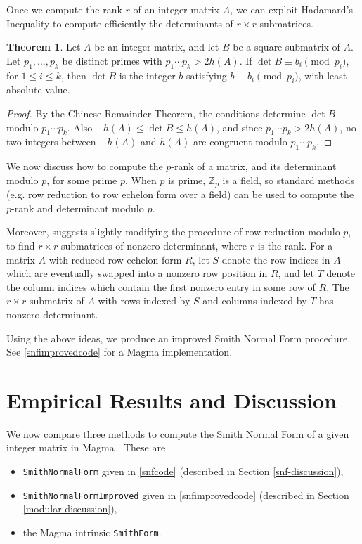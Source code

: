 \documentclass[12pt,a4paper,answers]{exam}
\newcommand{\Z}{\mathbb{Z}}
\theoremstyle{definition}
\newtheorem{theorem}{Theorem}[section]
\begin{document}
Once we compute the rank $r$ of an integer matrix $A$, we can exploit Hadamard's Inequality to compute efficiently the determinants of $r\times r$ submatrices.

\begin{theorem}
  Let $A$ be an integer matrix, and let $B$ be a square submatrix of $A$. Let $p_1,\ldots,p_k$ be distinct primes with $p_1\cdots p_k>2h(A)$. If $\det B\equiv b_i\pmod{p_i}$, for $1\leq i\leq k$, then $\det B$ is the integer $b$ satisfying $b\equiv b_i\pmod{p_i}$, with least absolute value.
\end{theorem}

\begin{proof}
  By the Chinese Remainder Theorem, the conditions determine $\det B$ modulo $p_1\cdots p_k$. Also $-h(A)\leq\det B\leq h(A)$, and since $p_1\cdots p_k>2h(A)$, no two integers between $-h(A)$ and $h(A)$ are congruent modulo $p_1\cdots p_k$. 
\end{proof}

We now discuss how to compute the $p$-rank of a matrix, and its determinant modulo $p$, for some prime $p$. When $p$ is prime, $\Z_p$ is a field, so standard methods (e.g. row reduction to row echelon form over a field) can be used to compute the $p$-rank and determinant modulo $p$.

Moreover, \cite{sims} suggests slightly modifying the procedure of row reduction modulo $p$, to find $r\times r$ submatrices of nonzero determinant, where $r$ is the rank. For a matrix $A$ with reduced row echelon form $R$, let $S$ denote the row indices in $A$ which are eventually swapped into a nonzero row position in $R$, and let $T$ denote the column indices which contain the first nonzero entry in some row of $R$. The $r\times r$ submatrix of $A$ with rows indexed by $S$ and columns indexed by $T$ has nonzero determinant.

Using the above ideas, we produce an improved Smith Normal Form procedure. See \autoref{snfimprovedcode} for a {\sc Magma} implementation.

\section{Empirical Results and Discussion}
\label{conclusion}

We now compare three methods to compute the Smith Normal Form of a given integer matrix in {\sc Magma} \cite{magma}. These are
\begin{itemize}
\item \texttt{SmithNormalForm} given in \autoref{snfcode} (described in Section \ref{snf-discussion}), \item \texttt{SmithNormalFormImproved} given in \autoref{snfimprovedcode} (described in Section \ref{modular-discussion}),
\item the {\sc Magma} intrinsic \texttt{SmithForm}.
\end{itemize}
\end{document}
